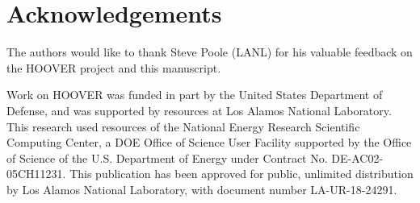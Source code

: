 \section{Acknowledgements}

The authors would like to thank Steve Poole (LANL) for his valuable feedback on
the HOOVER project and this manuscript.

Work on HOOVER was funded in part by the United States Department of
Defense, and was supported by resources at Los Alamos National
Laboratory. This research used resources of the National Energy Research
Scientific Computing Center, a DOE Office of Science User Facility supported by
the Office of Science of the U.S. Department of Energy under Contract No. DE-AC02-05CH11231. This publication has been approved for public, unlimited distribution by Los
Alamos National Laboratory, with document number LA-UR-18-24291.
